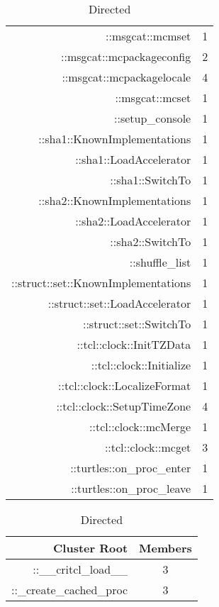 \documentclass{article}[letter,10pt]
\begin{document}
{{{\begin{table}[!htbp]
\begin{subtable}[t]{0.48\textwidth}
{\begin{tabular}[t]{r|c}
              ::msgcat::mcmset  & 1 \\
              ::msgcat::mcpackageconfig  & 2 \\
              ::msgcat::mcpackagelocale  & 4 \\
              ::msgcat::mcset  & 1 \\
              ::setup\_console  & 1 \\
              ::sha1::KnownImplementations  & 1 \\
              ::sha1::LoadAccelerator  & 1 \\
              ::sha1::SwitchTo  & 1 \\
              ::sha2::KnownImplementations  & 1 \\
              ::sha2::LoadAccelerator  & 1 \\
              ::sha2::SwitchTo  & 1 \\
              ::shuffle\_list  & 1 \\
              ::struct::set::KnownImplementations  & 1 \\
              ::struct::set::LoadAccelerator  & 1 \\
              ::struct::set::SwitchTo  & 1 \\
              ::tcl::clock::InitTZData  & 1 \\
              ::tcl::clock::Initialize  & 1 \\
              ::tcl::clock::LocalizeFormat  & 1 \\
              ::tcl::clock::SetupTimeZone  & 4 \\
              ::tcl::clock::mcMerge  & 1 \\
              ::tcl::clock::mcget  &  3 \\
              ::turtles::on\_proc\_enter  & 1 \\
              ::turtles::on\_proc\_leave  & 1 \\
              \bottomrule
            \end{tabular}}
            \caption{Directed}
          \end{subtable}
          \begin{subtable}[t]{0.48\textwidth}
            {\footnotesize
            \begin{tabular}[t]{r|c}
              \toprule
              Cluster Root & Members \\
              \midrule
              ::\_\_critcl\_load\_\_  & 3 \\
              ::\_create\_cached\_proc  & 3 \\

\end{tabular}}
\end{subtable}
\end{table}}}}
\end{document}
